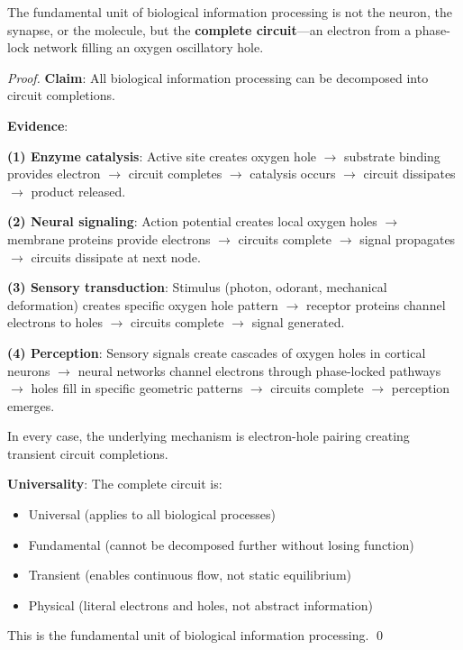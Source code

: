 \begin{theorem}
\label{thm:complete_circuit_unit}
The fundamental unit of biological information processing is not the neuron, the synapse, or the molecule, but the \textbf{complete circuit}—an electron from a phase-lock network filling an oxygen oscillatory hole.
\end{theorem}

\begin{proof}
\textbf{Claim}: All biological information processing can be decomposed into circuit completions.

\textbf{Evidence}:

\textbf{(1) Enzyme catalysis}: Active site creates oxygen hole $\to$ substrate binding provides electron $\to$ circuit completes $\to$ catalysis occurs $\to$ circuit dissipates $\to$ product released.

\textbf{(2) Neural signaling}: Action potential creates local oxygen holes $\to$ membrane proteins provide electrons $\to$ circuits complete $\to$ signal propagates $\to$ circuits dissipate at next node.

\textbf{(3) Sensory transduction}: Stimulus (photon, odorant, mechanical deformation) creates specific oxygen hole pattern $\to$ receptor proteins channel electrons to holes $\to$ circuits complete $\to$ signal generated.

\textbf{(4) Perception}: Sensory signals create cascades of oxygen holes in cortical neurons $\to$ neural networks channel electrons through phase-locked pathways $\to$ holes fill in specific geometric patterns $\to$ circuits complete $\to$ perception emerges.

In every case, the underlying mechanism is electron-hole pairing creating transient circuit completions.

\textbf{Universality}: The complete circuit is:
\begin{itemize}
\item Universal (applies to all biological processes)
\item Fundamental (cannot be decomposed further without losing function)
\item Transient (enables continuous flow, not static equilibrium)
\item Physical (literal electrons and holes, not abstract information)
\end{itemize}

This is the fundamental unit of biological information processing. \qed
\end{proof}
